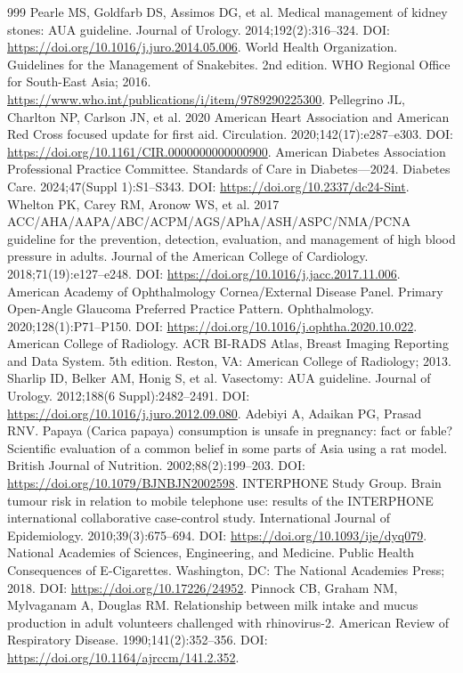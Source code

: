 \documentclass[11pt,oneside]{book}
\begin{document}
\begin{thebibliography}{999}
Pearle MS, Goldfarb DS, Assimos DG, et al. Medical management of kidney stones: AUA guideline. Journal of Urology. 2014;192(2):316--324. DOI: \url{https://doi.org/10.1016/j.juro.2014.05.006}.
World Health Organization. Guidelines for the Management of Snakebites. 2nd edition. WHO Regional Office for South-East Asia; 2016. \url{https://www.who.int/publications/i/item/9789290225300}.
Pellegrino JL, Charlton NP, Carlson JN, et al. 2020 American Heart Association and American Red Cross focused update for first aid. Circulation. 2020;142(17):e287--e303. DOI: \url{https://doi.org/10.1161/CIR.0000000000000900}.
American Diabetes Association Professional Practice Committee. Standards of Care in Diabetes---2024. Diabetes Care. 2024;47(Suppl 1):S1--S343. DOI: \url{https://doi.org/10.2337/dc24-Sint}.
Whelton PK, Carey RM, Aronow WS, et al. 2017 ACC/AHA/AAPA/ABC/ACPM/AGS/APhA/ASH/ASPC/NMA/PCNA guideline for the prevention, detection, evaluation, and management of high blood pressure in adults. Journal of the American College of Cardiology. 2018;71(19):e127--e248. DOI: \url{https://doi.org/10.1016/j.jacc.2017.11.006}.
American Academy of Ophthalmology Cornea/External Disease Panel. Primary Open-Angle Glaucoma Preferred Practice Pattern. Ophthalmology. 2020;128(1):P71--P150. DOI: \url{https://doi.org/10.1016/j.ophtha.2020.10.022}.
American College of Radiology. ACR BI-RADS Atlas, Breast Imaging Reporting and Data System. 5th edition. Reston, VA: American College of Radiology; 2013.
Sharlip ID, Belker AM, Honig S, et al. Vasectomy: AUA guideline. Journal of Urology. 2012;188(6 Suppl):2482--2491. DOI: \url{https://doi.org/10.1016/j.juro.2012.09.080}.
Adebiyi A, Adaikan PG, Prasad RNV. Papaya (Carica papaya) consumption is unsafe in pregnancy: fact or fable? Scientific evaluation of a common belief in some parts of Asia using a rat model. British Journal of Nutrition. 2002;88(2):199--203. DOI: \url{https://doi.org/10.1079/BJNBJN2002598}.
INTERPHONE Study Group. Brain tumour risk in relation to mobile telephone use: results of the INTERPHONE international collaborative case-control study. International Journal of Epidemiology. 2010;39(3):675--694. DOI: \url{https://doi.org/10.1093/ije/dyq079}.
National Academies of Sciences, Engineering, and Medicine. Public Health Consequences of E-Cigarettes. Washington, DC: The National Academies Press; 2018. DOI: \url{https://doi.org/10.17226/24952}.
Pinnock CB, Graham NM, Mylvaganam A, Douglas RM. Relationship between milk intake and mucus production in adult volunteers challenged with rhinovirus-2. American Review of Respiratory Disease. 1990;141(2):352--356. DOI: \url{https://doi.org/10.1164/ajrccm/141.2.352}.

\end{thebibliography}
\end{document}
